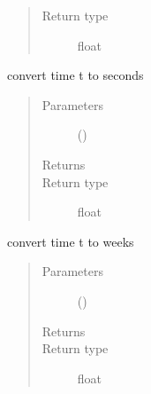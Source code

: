 \documentclass[letterpaper,10pt,english]{sphinxmanual}
\begin{document}
\begin{fulllineitems}
\begin{fulllineitems}
\begin{quote}
\begin{description}
\item[{Return type}] \leavevmode
float

\end{description}\end{quote}

\end{fulllineitems}


\begin{fulllineitems}
\label{\detokenize{Reference:salabim.Environment.to_seconds}}
convert time t to seconds
\begin{quote}\begin{description}
\item[{Parameters}] \leavevmode
{} () \textendash{} 

\item[{Returns}] \leavevmode
{}

\item[{Return type}] \leavevmode
float

\end{description}\end{quote}

\end{fulllineitems}


\begin{fulllineitems}
\label{\detokenize{Reference:salabim.Environment.to_weeks}}
convert time t to weeks
\begin{quote}\begin{description}
\item[{Parameters}] \leavevmode
{} () \textendash{} 

\item[{Returns}] \leavevmode
{}

\item[{Return type}] \leavevmode
float

\end{description}\end{quote}


\end{fulllineitems}
\end{fulllineitems}
\end{document}
